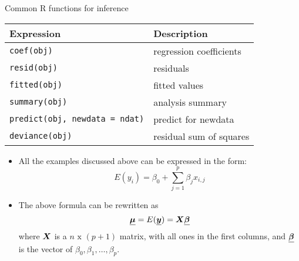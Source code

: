 \begin{frame}
  \vspace{0.5cm}
  Common R functions for inference
  \vspace{0.25cm}
  \begin{center}
    \begin{tabular}{ll}
      \hline
      Expression & Description \\
      \hline
      \texttt{coef(obj)} & regression coefficients \\
      \texttt{resid(obj)} & residuals \\
      \texttt{fitted(obj)} & fitted values \\
      \texttt{summary(obj)} & analysis summary \\
      \texttt{predict(obj, newdata = ndat)} & predict for newdata \\
      \texttt{deviance(obj)} & residual sum of squares\\
      \hline
    \end{tabular} 
  \end{center}
\end{frame}




\begin{frame}
  \begin{itemize}
    \vspace{0.5cm}
    \item All the examples discussed above can be expressed in the form:
      $$ E(y_i) = \beta_0 + \displaystyle\sum_{j=1}^p \beta_j x_{i,j} $$
    \vspace{0.5cm}
    \item The above formula can be rewritten as
      $$ \boldsymbol{\underline{\mu}} = E(\boldsymbol{\underline{y}}) = \boldsymbol{X} \boldsymbol{\underline{\beta}} $$
      where $ \boldsymbol{X} $ is a $ n \text{ x } (p+1) $ matrix, with all ones in the first columns, and $ \boldsymbol{\underline{\beta}} $ is the vector of $ \beta_0, \beta_1, \dots, \beta_p $.
  \end{itemize}
\end{frame}


